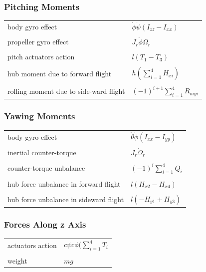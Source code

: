 \documentclass{thesisreport}
\begin{document}
\subsubsection*{Pitching Moments}

\setlength{\tabcolsep}{20pt}
 \begin{tabular}{lp{}}
 body gyro effect & $\dot{\phi}\dot{\psi}(I_{zz}-I_{xx})$\\
 \\
 propeller gyro effect & $J_r \dot{\phi}\Omega_r$ \\
 \\
 pitch actuators action & $l(T_1-T_3)$\\
 \\
 hub moment due to forward flight & $h(\sum_{i=1}^4 H_{xi})$\\
 \\
 rolling moment due to side-ward flight &  $(-1)^{i+1}\sum_{i=1}^4 R_{myi}$\\
\end{tabular}

\subsubsection*{Yawing Moments}

\setlength{\tabcolsep}{20pt}
 \begin{tabular}{lp{}}
body gyro effect & $\dot{\theta}\dot{\phi}(I_{xx}-I_{yy})$\\
\\
inertial counter-torque & $J_r \dot{\Omega}_r$\\
\\
counter-torque unbalance & $(-1)^i\sum_{i=1}^4 Q_i$\\
\\
hub force unbalance in forward flight & $l(H_{x2}-H_{x4})$ \\
\\
hub force unbalance in sideward flight & $l(-H_{y1}+H_{y3})$\\

\end{tabular}


\subsubsection*{Forces Along z Axis}

%
\setlength{\tabcolsep}{58pt}
 \begin{tabular}{lp{}}
actuators action & $c \psi c \phi (\sum_{i=1}^4T_i$\\
\\
weight & $mg$ \\

\end{tabular}
\end{document}
